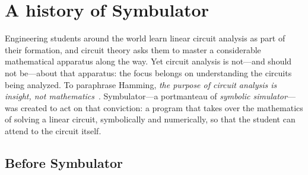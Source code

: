 \documentclass[11pt,oneside]{report}
\begin{document}
\tableofcontents

\chapter{A history of Symbulator}
\label{ch:history}

Engineering students around the world learn linear circuit analysis as
part of their formation, and circuit theory asks them to master a
considerable mathematical apparatus along the way. Yet circuit
analysis is not---and should not be---about that apparatus: the focus
belongs on understanding the circuits being analyzed. To paraphrase
Hamming, \emph{the purpose of circuit analysis is insight, not
mathematics}~\cite{fragment2014}. Symbulator---a portmanteau of
\emph{symbolic simulator}---was created to act on that conviction: a
program that takes over the mathematics of solving a linear circuit,
symbolically and numerically, so that the student can attend to the
circuit itself.

\section{Before Symbulator}
\end{document}
